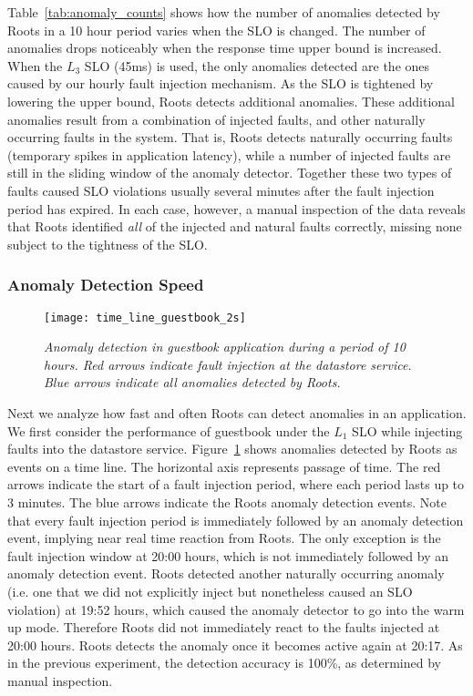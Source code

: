 Table~\ref{tab:anomaly_counts} shows how the number of anomalies detected by 
Roots in a 10 hour period varies when the SLO is changed. The number of anomalies
drops noticeably when the response time upper bound is increased. When the $L_3$
SLO (45ms) is used, the only anomalies detected are the ones
caused by our hourly fault injection mechanism. As the SLO is tightened by lowering the upper bound,
Roots detects additional anomalies. These additional anomalies
result from a combination of injected faults, and other naturally occurring faults
in the system. That is, Roots detects naturally occurring
faults (temporary spikes in application latency), while a number of injected faults
are still in the sliding window of the anomaly detector. Together these two types of
faults caused SLO violations usually several minutes after the fault injection period
has expired.  In each case, however, a manual inspection of the data reveals
that Roots identified \textit{all} of the injected and natural faults correctly,
missing none subject to the tightness of the SLO.

\subsubsection{Anomaly Detection Speed}

\begin{figure}
\centering
\texttt{[image: time\_line\_guestbook\_2s]}
\vspace{-0.3in}
\caption{\textit{Anomaly detection in guestbook application during a period of 10 hours. 
Red arrows indicate fault injection
at the datastore service. Blue arrows indicate all anomalies detected by
Roots.
}}
\label{fig:time_line_guestbook_2s}
\end{figure}

Next we analyze how fast and often Roots can detect anomalies in an application. We
first consider the performance of guestbook under the $L_1$ SLO while 
injecting faults into the datastore service. Figure~\ref{fig:time_line_guestbook_2s} shows
anomalies detected by Roots as events on a time line. The horizontal axis represents 
passage of time. The red arrows indicate the start of a fault injection period, where each
period lasts up to 3 minutes.
The blue arrows indicate the Roots anomaly detection events.
Note that every fault injection period is immediately followed by an anomaly
detection event, implying near real time reaction from Roots. The only exception is the fault
injection window at 20:00 hours, which is not immediately followed by an anomaly 
detection event. Roots detected another naturally occurring anomaly
(i.e. one
that we did not explicitly inject but nonetheless caused an SLO violation) at 19:52 hours,
which caused the anomaly detector to go into the warm up mode. Therefore Roots
did not immediately react to the faults injected at 20:00 hours. Roots detects the anomaly once it becomes
active again at 20:17. As in the previous
experiment, the detection accuracy is 100\%, as determined by manual
inspection.

